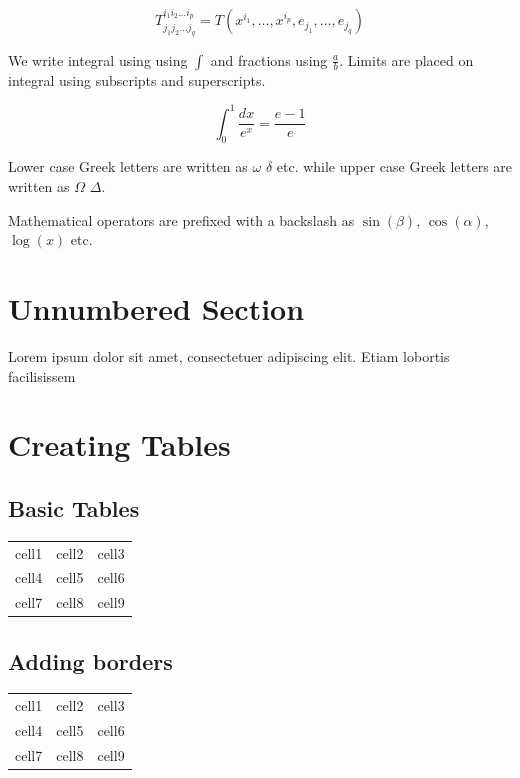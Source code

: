 \documentclass[12pt, a4paper]{report}
\begin{document}
\[ T^{i_1 i_2 \dots i_p}_{j_1 j_2 \dots j_q} = T(x^{i_1},\dots,x^{i_p},e_{j_1},\dots,e_{j_q}) \]

We write integral using using $\int$ and fractions using $\frac{a}{b}$. Limits are placed on integral using subscripts and superscripts.

\[ \int_0^1 \frac{dx}{e^x} =  \frac{e-1}{e} \]

Lower case Greek letters are written as $\omega$ $\delta$ etc. while upper case Greek letters are written as $\Omega$ $\Delta$.

Mathematical operators are prefixed with a backslash as $\sin(\beta)$, $\cos(\alpha)$, $\log(x)$ etc.

\section*{Unnumbered Section}
Lorem ipsum dolor sit amet, consectetuer adipiscing elit. Etiam lobortis facilisissem

\section{Creating Tables}

\subsection{Basic Tables}
\begin{center}
    \begin{tabular}{ c c c }
        cell1 & cell2 & cell3 \\
        cell4 & cell5 & cell6 \\
        cell7 & cell8 & cell9
    \end{tabular}
\end{center}

\subsection{Adding borders}
\begin{center}
    \begin{tabular}{ |c|c|c| }
        \hline
        cell1 & cell2 & cell3 \\
        cell4 & cell5 & cell6 \\
        cell7 & cell8 & cell9 \\
        \hline
    \end{tabular}
\end{center}
\end{document}
